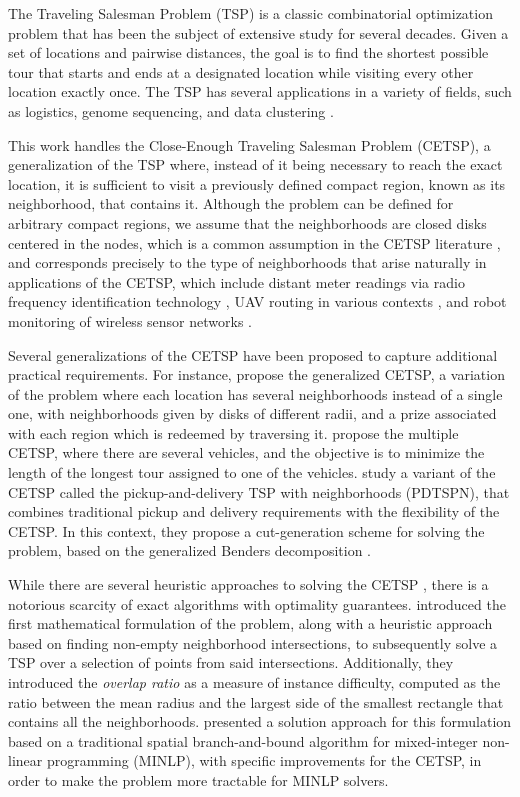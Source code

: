 \documentclass[pdflatex,sn-mathphys-num]{sn-jnl}%
\begin{document}
The Traveling Salesman Problem (TSP) is a classic combinatorial optimization problem that has been the subject of extensive study for several decades. Given a set of locations and pairwise distances, the goal is to find the shortest possible tour that starts and ends at a designated location while visiting every other location exactly once. The TSP has several applications in a variety of fields, such as logistics, genome sequencing, and data clustering \cite{book:Applegate}.

This work handles the Close-Enough Traveling Salesman Problem (CETSP), a generalization of the TSP where, instead of it being necessary to reach the exact location, it is sufficient to visit a previously defined compact region, known as its neighborhood, that contains it. Although the problem can be defined for arbitrary compact regions, we assume that the neighborhoods are closed disks centered in the nodes, which is a common assumption in the CETSP literature \cite{behdani, branch}, and corresponds precisely to the type of neighborhoods that arise naturally in applications of the CETSP, which include distant meter readings via radio frequency identification technology \cite{genetic}, UAV routing in various contexts \cite{branch}, and robot monitoring of wireless sensor networks \cite{yuan}. 

Several generalizations of the CETSP have been proposed to capture additional practical requirements. For instance, \citet{generalized} propose the generalized CETSP, a variation of the problem where each location has several neighborhoods instead of a single one, with neighborhoods given by disks of different radii, and a prize associated with each region which is redeemed by traversing it. \citet{mcetsp} propose the multiple CETSP, where there are several vehicles, and the objective is to minimize the length of the longest tour assigned to one of the vehicles. \citet{walteros} study a variant of the CETSP called the pickup-and-delivery TSP with neighborhoods (PDTSPN), that combines traditional pickup and delivery requirements with the flexibility of the CETSP. In this context, they propose a cut-generation scheme for solving the problem, based on the generalized Benders decomposition \cite{gbd}.

While there are several heuristic approaches to solving the CETSP \cite{genetic, mennell, memetic}, there is a notorious scarcity of exact algorithms with optimality guarantees. \citet{mennell} introduced the first mathematical formulation of the problem, along with a heuristic approach based on finding non-empty neighborhood intersections, to subsequently solve a TSP over a selection of points from said intersections. Additionally, they introduced the \textit{overlap ratio} as a measure of instance difficulty, computed as the ratio between the mean radius and the largest side of the smallest rectangle that contains all the neighborhoods. \citet{gentilini2013travelling} presented a solution approach for this formulation based on a traditional spatial branch-and-bound algorithm for mixed-integer non-linear programming (MINLP), with specific improvements for the CETSP, in order to make the problem more tractable for MINLP solvers.
\end{document}
